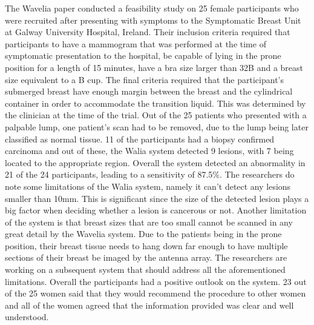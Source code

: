 \noindent The Wavelia paper \cite{moloneyWaveliaMicrowaveBreast2021} conducted a feasibility study on 25 female
participants who were recruited after presenting with symptoms to the Symptomatic Breast Unit at Galway University
Hospital, Ireland. Their inclusion criteria required that participants to have a mammogram that was performed at the
time of symptomatic presentation to the hospital, be capable of lying in the prone position for a length of 15 minutes,
have a bra size larger than 32B and a breast size equivalent to a B cup. The final criteria required that the
participant's submerged breast have enough margin between the breast and the cylindrical container in order to
accommodate the transition liquid. This was determined by the clinician at the time of the trial. Out of the 25 patients
who presented with a palpable lump, one patient's scan had to be removed, due to the lump being later classified as
normal tissue. 11 of the participants had a biopsy confirmed carcinoma and out of these, the Walia system detected 9 lesions,
with 7 being located to the appropriate region. Overall the system detected an abnormality in 21 of the 24 participants,
leading to a sensitivity of 87.5\%. The researchers do note some limitations of the Walia system, namely it can't detect
any lesions smaller than 10mm. This is significant since the size of the detected lesion plays a big factor when
deciding whether a lesion is cancerous or not. Another limitation of the system is that breast sizes that are too small
cannot be scanned in any great detail by the Wavelia system. Due to the patients being in the prone position, their
breast tissue needs to hang down far enough to have multiple sections of their breast be imaged by the antenna array.
The researchers are working on a subsequent system that should address all the aforementioned limitations. Overall the
participants had a positive outlook on the system. 23 out of the 25 women said that they would recommend the procedure
to other women and all of the women agreed that the information provided was clear and well understood.

